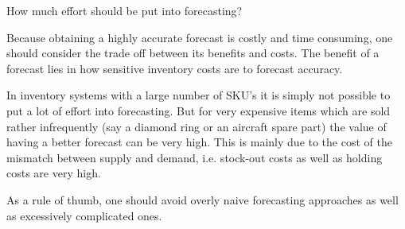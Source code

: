 \begin{exercise}
How much effort should be put into forecasting?



  \begin{solution}

	Because obtaining a highly accurate forecast is costly and time consuming, one should consider the trade off between its benefits and costs. The benefit of a forecast lies in how sensitive inventory costs are to forecast accuracy. 
	
	In inventory systems with a large number of SKU's it is simply not possible to put a lot of effort into forecasting. But for very expensive items which are sold rather infrequently (say a diamond ring or an aircraft spare part) the value of having a better forecast can be very high. This is mainly due to the cost of the mismatch between supply and demand, i.e. stock-out costs as well as holding costs are very high. 
	
	As a rule of thumb, one should avoid overly naive forecasting approaches as well as excessively complicated ones. 
  \end{solution}
\end{exercise}


